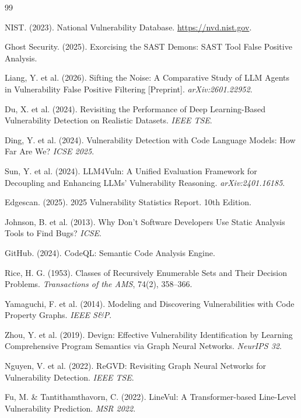 \documentclass[a4paper, 12pt]{extreport}
\begin{document}
\renewcommand\bibname{REFERENCES}
\small
\begin{thebibliography}{99}
{
\vspace{0.5pt}

 NIST. (2023). National Vulnerability Database. \url{https://nvd.nist.gov}.

 Ghost Security. (2025). Exorcising the SAST Demons: SAST Tool False Positive Analysis.

 Liang, Y. et al. (2026). Sifting the Noise: A Comparative Study of LLM Agents in Vulnerability False Positive Filtering [Preprint]. \textit{arXiv:2601.22952}.

 Du, X. et al. (2024). Revisiting the Performance of Deep Learning-Based Vulnerability Detection on Realistic Datasets. \textit{IEEE TSE}.

 Ding, Y. et al. (2024). Vulnerability Detection with Code Language Models: How Far Are We? \textit{ICSE 2025}.

 Sun, Y. et al. (2024). LLM4Vuln: A Unified Evaluation Framework for Decoupling and Enhancing LLMs' Vulnerability Reasoning. \textit{arXiv:2401.16185}.

 Edgescan. (2025). 2025 Vulnerability Statistics Report. 10th Edition.

 Johnson, B. et al. (2013). Why Don't Software Developers Use Static Analysis Tools to Find Bugs? \textit{ICSE}.

 GitHub. (2024). CodeQL: Semantic Code Analysis Engine.

 Rice, H. G. (1953). Classes of Recursively Enumerable Sets and Their Decision Problems. \textit{Transactions of the AMS}, 74(2), 358--366.

 Yamaguchi, F. et al. (2014). Modeling and Discovering Vulnerabilities with Code Property Graphs. \textit{IEEE S\&P}.

 Zhou, Y. et al. (2019). Devign: Effective Vulnerability Identification by Learning Comprehensive Program Semantics via Graph Neural Networks. \textit{NeurIPS 32}.

 Nguyen, V. et al. (2022). ReGVD: Revisiting Graph Neural Networks for Vulnerability Detection. \textit{IEEE TSE}.

 Fu, M. \& Tantithamthavorn, C. (2022). LineVul: A Transformer-based Line-Level Vulnerability Prediction. \textit{MSR 2022}.

}
\end{thebibliography}
\end{document}

